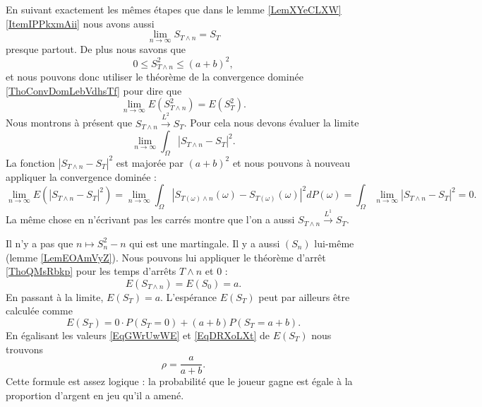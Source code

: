 En suivant exactement les mêmes étapes que dans le lemme \ref{LemXYeCLXW}\ref{ItemIPPkxmAii} nous avons aussi
\begin{equation}
    \lim_{n\to \infty} S_{T\wedge n}=S_T
\end{equation}
presque partout. De plus nous savons que
\begin{equation}
    0\leq S_{T\wedge n}^2\leq (a+b)^2,
\end{equation}
et nous pouvons donc utiliser le théorème de la convergence dominée \ref{ThoConvDomLebVdhsTf} pour dire que
\begin{equation}
    \lim_{n\to \infty} E(S^2_{T\wedge n})=E(S_T^2).
\end{equation}
Nous montrons à présent que \( S_{T\wedge n}\stackrel{L^2}{\longrightarrow}S_T\). Pour cela nous devons évaluer la limite
\begin{equation}
    \lim_{n\to \infty} \int_{\Omega}| S_{T\wedge n}-S_T |^2.
\end{equation}
La fonction \( | S_{T\wedge n}-S_T |^2\) est majorée par \( (a+b)^2\) et nous pouvons à nouveau appliquer la convergence dominée :
\begin{equation}
    \lim_{n\to \infty} E(| S_{T\wedge n}-S_T |^2)=\lim_{n\to \infty} \int_{\Omega}| S_{T(\omega)\wedge n}(\omega)-S_{T(\omega)}(\omega) |^2dP(\omega)=\int_{\Omega}\lim_{n\to \infty} | S_{T\wedge n}-S_T |^2=0.
\end{equation}
La même chose en n'écrivant pas les carrés montre que l'on a aussi \( S_{T\wedge n}\stackrel{L^1}{\longrightarrow}S_T\).

Il n'y a pas que \( n\mapsto S_n^2-n\) qui est une martingale. Il y a aussi \( (S_n)\) lui-même (lemme \ref{LemEOAmVyZ}). Nous pouvons lui appliquer le théorème d'arrêt \ref{ThoQMsRbkp} pour les temps d'arrêts \( T\wedge n\) et \( 0\) :
\begin{equation}    \label{EqGWrUwWE}
    E(S_{T\wedge n})=E(S_0)=a.
\end{equation}
En passant à la limite, \( E(S_T)=a\). L'espérance \( E(S_T)\) peut par ailleurs être calculée comme
\begin{equation}    \label{EqDRXoLXt}
    E(S_T)=0\cdot P(S_T=0)+(a+b)P(S_T=a+b).
\end{equation}
En égalisant les valeurs \eqref{EqGWrUwWE} et \eqref{EqDRXoLXt} de \( E(S_T)\) nous trouvons
\begin{equation}    \label{EqIHhbeCB}
    \rho=\frac{ a }{ a+b }.
\end{equation}
Cette formule est assez logique : la probabilité que le joueur gagne est égale à la proportion d'argent en jeu qu'il a amené.

